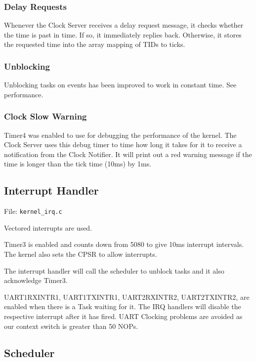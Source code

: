 \documentclass[letterpaper]{article}
\begin{document}
\subsubsection{Delay Requests%
  \label{delay-requests}%
}

Whenever the Clock Server receives a delay request message, it checks whether the time is past in time. If so, it immediately replies back. Otherwise, it stores the requested time into the array mapping of TIDs to ticks.


\subsubsection{Unblocking%
  \label{unblocking}%
}

Unblocking tasks on events has been improved to work in constant time.  See performance.


\subsubsection{Clock Slow Warning%
  \label{clock-slow-warning}%
}

Timer4 was enabled to use for debugging the performance of the kernel. The Clock Server uses this debug timer to time how long it takes for it to receive a notification from the Clock Notifier. It will print out a red warning message if the time is longer than the tick time (10ms) by 1ms.


\subsection{Interrupt Handler%
  \label{interrupt-handler}%
}

File: \texttt{kernel\_irq.c}

Vectored interrupts are used.

Timer3 is enabled and counts down from 5080 to give 10ms interrupt intervals. The kernel also sets the CPSR to allow interrupts.

The interrupt handler will call the scheduler to unblock tasks and it also acknowledge Timer3.

UART1RXINTR1, UART1TXINTR1, UART2RXINTR2, UART2TXINTR2, are enabled when there is a Task waiting for it. The IRQ handlers will disable the respective interrupt after it has fired. UART Clocking problems are avoided as our context switch is greater than 50 NOPs.


\subsection{Scheduler%
  \label{scheduler}%
}
\end{document}
